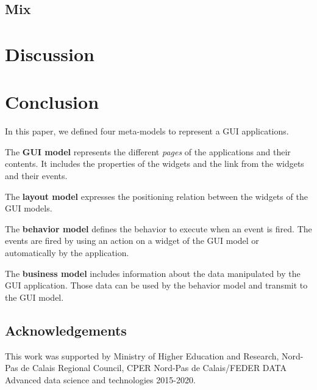 \documentclass[conference]{IEEEtran}
\begin{document}
\subsection{Mix}
\label{sec:reverseMix}

\section{Discussion}
\label{sec:discussion}



\section{Conclusion}
\label{sec:conclusion}


In this paper, we defined four meta-models to represent a GUI applications.

The \textbf{GUI model} represents the different \textit{pages} of the applications and their contents.
It includes the properties of the widgets and the link from the widgets and their events.

The \textbf{layout model} expresses the positioning relation between the widgets of the GUI models.

The \textbf{behavior model} defines the behavior to execute when
    an event is fired.
The events are fired by using an action on a widget of the GUI model or
    automatically by the application.

The \textbf{business model} includes information about the data manipulated
    by the GUI application.
Those data can be used by the behavior model and transmit to the
    GUI model.

\subsection*{Acknowledgements} 
This work was supported by Ministry of Higher Education and Research, Nord-Pas de Calais Regional Council, CPER Nord-Pas de Calais/FEDER DATA Advanced data science and technologies 2015-2020.

%


\end{document}
